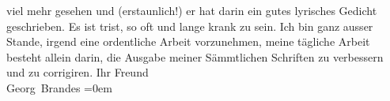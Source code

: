 \begin{ledgroupsized}[t]{13cm}
               viel mehr gesehen und (erstaunlich!) er hat darin ein gutes lyrisches Gedicht
               geschrieben.\pend
           \pstart
           Es ist trist, so oft und lange krank zu sein. Ich bin ganz ausser Stande, irgend eine
               ordentliche Arbeit vorzunehmen, meine tägliche Arbeit besteht allein darin, die
               Ausgabe meiner Sämmtlichen
                  Schriften zu verbessern und zu corrigiren.\pend
           \pstart
           Ihr Freund{\\[\baselineskip]}\spacefill\mbox{Georg Brandes}\pend
           \leftskip=0em{}
         
         \endnumbering{}\end{ledgroupsized}  \newcommand{\dateiname}{L01033}\newcommand{\titel}{Georg Brandes an Arthur Schnitzler, 30. 4. 1900}\newcommand{\editorInnen}{Martin Anton Müller und Gerd-Hermann Susen}
      